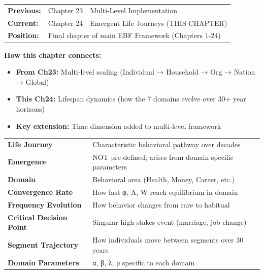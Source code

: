 \begin{tcolorbox}[colback=gray!5!white, colframe=gray!75!black, title=Chapter Navigation]
\begin{tabular}{@{}lll@{}}
\textbf{Previous:} & Chapter 23 & Multi-Level Implementation \\
\textbf{Current:} & Chapter 24 & Emergent Life Journeys (THIS CHAPTER) \\
\textbf{Position:} & \multicolumn{2}{l}{Final chapter of main EBF Framework (Chapters 1-24)} \\
\end{tabular}

\medskip
\textbf{How this chapter connects:}
\begin{itemize}[nosep]
\item \textbf{From Ch23:} Multi-level scaling (Individual → Household → Org → Nation → Global)
\item \textbf{This Ch24:} Lifespan dynamics (how the 7 domains evolve over 30+ year horizons)
\item \textbf{Key extension:} Time dimension added to multi-level framework
\end{itemize}
\end{tcolorbox}


\begin{tcolorbox}[colback=blue!5!white, colframe=blue!75!black, title=Key Concepts in This Chapter]
\small
\begin{tabular}{@{}ll@{}}
\textbf{Life Journey} & Characteristic behavioral pathway over decades \\
\textbf{Emergence} & NOT pre-defined; arises from domain-specific parameters \\
\textbf{Domain} & Behavioral area (Health, Money, Career, etc.) \\
\textbf{Convergence Rate} & How fast φ, A, W reach equilibrium in domain \\
\textbf{Frequency Evolution} & How behavior changes from rare to habitual \\
\textbf{Critical Decision Point} & Singular high-stakes event (marriage, job change) \\
\textbf{Segment Trajectory} & How individuals move between segments over 30 years \\
\textbf{Domain Parameters} & α, β, λ, ρ specific to each domain \\
\end{tabular}
\end{tcolorbox}

